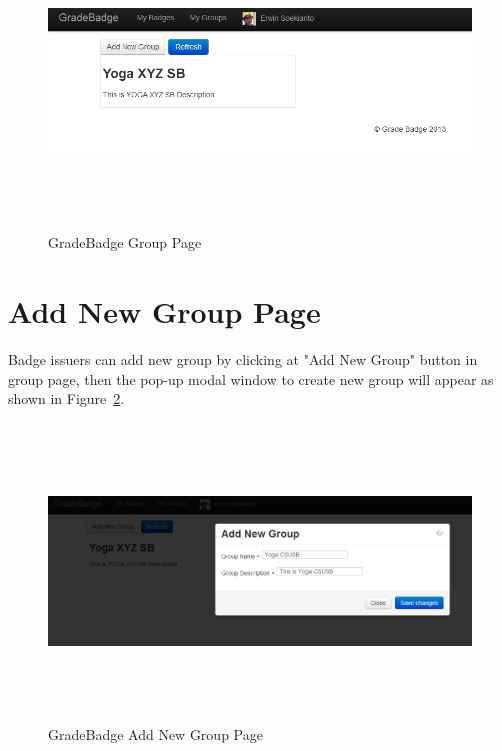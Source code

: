 \vspace{3em}
\begin{figure}[H]
\begin{center}
\includegraphics[height=3.1in,width=5.5in]{images/group-page1.png}
\caption{GradeBadge Group Page}
\label{fig:group-page1}
\end{center}
\end{figure}

\newpage
\section{Add New Group Page}
Badge issuers can add new group by clicking at "Add New Group" button in group page, then the pop-up modal window to create new group will appear  as shown in Figure~\ref{fig:add-new-group}. 

\vspace{3em}
\begin{figure}[H]
\begin{center}
\includegraphics[height=3.1in,width=5.5in]{images/add-new-group.png}
\caption{GradeBadge Add New Group Page}
\label{fig:add-new-group}
\end{center}
\end{figure}

